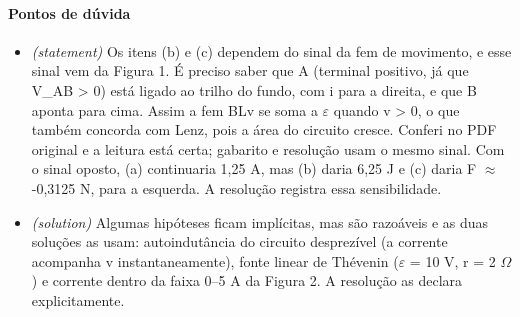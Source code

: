 \documentclass{article}%
\begin{document}
\paragraph{Pontos de dúvida}%
\begin{itemize}%
\item%
\textit{(statement)} Os itens (b) e (c) dependem do sinal da fem de movimento, e esse sinal vem da Figura 1. É preciso saber que A (terminal positivo, já que V\_AB > 0) está ligado ao trilho do fundo, com i para a direita, e que B aponta para cima. Assim a fem BLv se soma a $\varepsilon$ quando v > 0, o que também concorda com Lenz, pois a área do circuito cresce. Conferi no PDF original e a leitura está certa; gabarito e resolução usam o mesmo sinal. Com o sinal oposto, (a) continuaria 1,25 A, mas (b) daria 6,25 J e (c) daria F $\approx$ -0,3125 N, para a esquerda. A resolução registra essa sensibilidade.%
\item%
\textit{(solution)} Algumas hipóteses ficam implícitas, mas são razoáveis e as duas soluções as usam: autoindutância do circuito desprezível (a corrente acompanha v instantaneamente), fonte linear de Thévenin ($\varepsilon$ = 10 V, r = 2 $\Omega$) e corrente dentro da faixa 0--5 A da Figura 2. A resolução as declara explicitamente.%
\end{itemize}%
\end{document}

